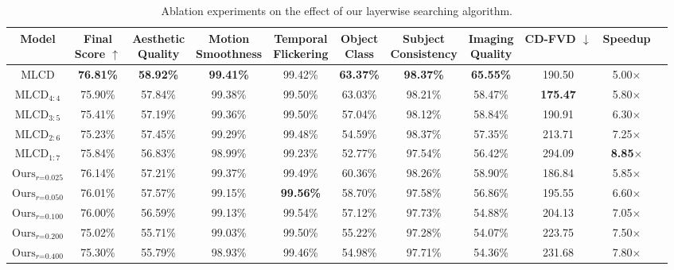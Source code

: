 \begin{table*}[h]
    \scriptsize \centering
    \setlength{\tabcolsep}{4pt}
    \caption{Ablation experiments on the effect of our layerwise searching algorithm.}
    \label{tab::ablation_layer}
    
    \begin{tabular}{ccccccccccc}
    \toprule 
    \textbf{Model} & \makecell{\textbf{Final} \\ \textbf{Score}} $\uparrow$&  \makecell{\textbf{Aesthetic} \\ \textbf{Quality}} & \makecell{\textbf{Motion} \\ \textbf{Smoothness}} & \makecell{\textbf{Temporal} \\ \textbf{Flickering}} & \makecell{\textbf{Object} \\ \textbf{Class}} & \makecell{\textbf{Subject} \\ \textbf{Consistency}} & \makecell{\textbf{Imaging} \\ \textbf{Quality}} & \textbf{CD-FVD} $\downarrow$ & \textbf{Speedup} \\
    \midrule
    MLCD & \textbf{76.81\%} & \textbf{58.92\%} & \textbf{99.41\%} & 99.42\% & \textbf{63.37\%} & \textbf{98.37\%} & \textbf{65.55\%} & 190.50 & 5.00$\times$ \\ 
    $\text{MLCD}_{4:4}$ & 75.90\% & 57.84\% & 99.38\% & 99.50\% & 63.03\% & 98.21\% & 58.47\%& \textbf{175.47} & 5.80$\times$ \\ 
    $\text{MLCD}_{3:5}$  & 75.41\% & 57.19\% & 99.36\% & 99.50\% & 57.04\% & 98.12\% & 58.84\%& 190.91 & 6.30$\times$ \\ 
    $\text{MLCD}_{2:6}$  & 75.23\% & 57.45\% & 99.29\% & 99.48\% & 54.59\% & 98.37\% & 57.35\%& 213.71 & 7.25$\times$ \\ 
    $\text{MLCD}_{1:7}$  & 75.84\% & 56.83\% & 98.99\% & 99.23\% & 52.77\% & 97.54\% & 56.42\%& 294.09 & \textbf{8.85$\times$} \\ 
    \midrule
    $\text{Ours}_{r\text{=0.025}}$& 76.14\% & 57.21\% & 99.37\% & 99.49\% & 60.36\% & 98.26\% & 58.90\%& 186.84 & 5.85$\times$ \\ 
    $\text{Ours}_{r\text{=0.050}}$& 76.01\% &  57.57\% & 99.15\% & \textbf{99.56\%} & 58.70\% & 97.58\% & 56.86\%& 195.55 & 6.60$\times$ \\ 
    $\text{Ours}_{r\text{=0.100}}$ & 76.00\% & 56.59\% & 99.13\% & 99.54\% & 57.12\% & 97.73\% & 54.88\%& 204.13 & 7.05$\times$ \\ 
    $\text{Ours}_{r\text{=0.200}}$ & 75.02\% & 55.71\% & 99.03\% & 99.50\% & 55.22\% & 97.28\% & 54.07\%& 223.75 & 7.50$\times$ \\ 
    $\text{Ours}_{r\text{=0.400}}$& 75.30\% & 55.79\% & 98.93\% & 99.46\% & 54.98\% & 97.71\% & 54.36\%& 231.68 & 7.80$\times$ \\ 
    \bottomrule
    \end{tabular}


\end{table*}
